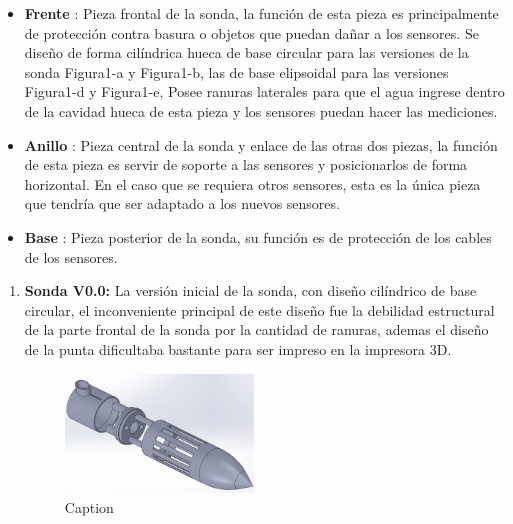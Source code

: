 \begin{appendices}
\begin{itemize}
\item \textbf{Frente} : Pieza frontal de la sonda, la función de esta pieza es principalmente de protección contra basura o objetos que puedan dañar a los sensores. Se dise\~no de forma cil\'indrica hueca de base circular para las versiones de la sonda Figura1-a y Figura1-b, las de base elipsoidal para las versiones Figura1-d y Figura1-e, Posee ranuras laterales para que el agua ingrese dentro de la cavidad hueca de esta pieza y los sensores puedan hacer las mediciones.  
\item \textbf{Anillo} : Pieza central de la sonda y enlace de las otras dos piezas, la función de esta pieza es servir de soporte a las sensores y posicionarlos de forma horizontal. En el caso que se requiera otros sensores, esta es la única pieza que tendría que ser adaptado a los nuevos sensores.
\item \textbf{Base}  : Pieza posterior de la sonda, su función es de protección de los cables de los sensores. 
\end{itemize}

\begin{enumerate}
\item \textbf{Sonda V0.0:} La versión inicial de la sonda, con diseño cilíndrico de base circular, el inconveniente principal de este diseño fue la debilidad estructural de la parte frontal de la sonda por la cantidad de ranuras, ademas el diseño de la punta dificultaba bastante para ser impreso en la impresora 3D.
\begin{figure}[ht]
    \centering
    \includegraphics[width=50mm]{Imagenes/Sonda_v0.jpg}
    \caption{Caption}
    \label{fig:my_label}
\end{figure}


\end{enumerate}
\end{appendices}
